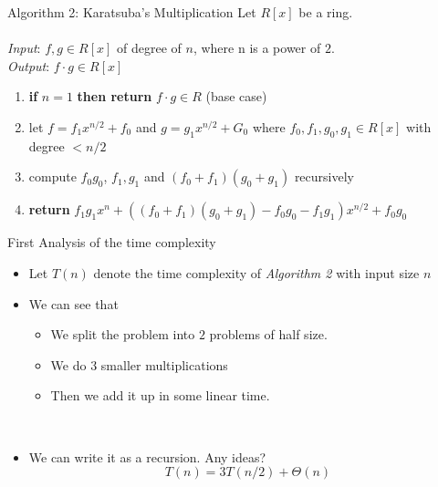 \documentclass[12pt]{beamer}
\begin{document}
\begin{frame}{}
\begin{block}{Algorithm 2: Karatsuba's Multiplication}
Let $R[x]$ be a ring.
\\~\\
\emph{Input}: $f, g \in R[x]$ of degree of $n$, where n is a power of $2$.\\
\emph{Output}: $f \cdot g \in R[x]$
\begin{enumerate}
\item \textbf{if} $n=1$ \textbf{then return} $f \cdot g \in R$ (base case)
\item let $f = f_1 x^{n/2}+f_0$ and $g = g_1 x^{n/2} + G_0$ where $f_0,f_1,g_0,g_1 \in R[x]$ with degree $<n/2$
\item compute $f_0 g_0$, $f_1, g_1$ and $(f_0+f_1)(g_0+g_1)$ recursively
\item \textbf{return} $f_1g_1 x^n + ((f_0+f_1)(g_0+g_1)-f_0g_0 - f_1g_1) x^{n/2} + f_0g_0$
\end{enumerate}
\end{block}
\end{frame}

\begin{frame}{First Analysis of the time complexity}
\begin{itemize}
\item Let $T(n)$ denote the time complexity of \emph{Algorithm 2} with input size $n$
\item We can see that
\begin{itemize}
\item We split the problem into $2$ problems of half size.
\item We do $3$ smaller multiplications
\item Then we add it up in some linear time.
\end{itemize}
~\\
\item We can write it as a recursion. Any ideas?
\pause
\[
T(n) = 3 T(n/2) + \Theta(n)
\]
\end{itemize}
\end{frame}
\end{document}
